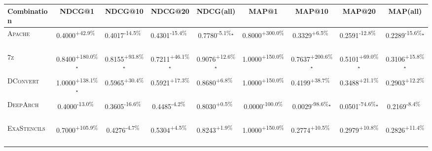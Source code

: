 \begin{table}[htbp]
\centering
\renewcommand{\arraystretch}{1.2}
\begin{tabular}{l|cccc|cccc}
\hline
Combination & NDCG@1 & NDCG@10 & NDCG@20 & NDCG(all) & MAP@1 & MAP@10 & MAP@20 & MAP(all) \\ \hline
\textsc{Apache} & \cellcolor{green!30}0.4000\textsuperscript{+42.9\%}$^{\,\,\,}$ & \cellcolor{red!30}0.4017\textsuperscript{-14.5\%}$^{\,\,\,}$ & \cellcolor{red!30}0.4301\textsuperscript{-15.4\%}$^{\,\,\,}$ & \cellcolor{red!30}0.7780\textsuperscript{-5.1\%}$^\star$ & \cellcolor{green!30}0.8000\textsuperscript{+300.0\%}$^{\,\,\,}$ & \cellcolor{green!30}0.3329\textsuperscript{+6.5\%}$^{\,\,\,}$ & \cellcolor{red!30}0.2591\textsuperscript{-12.8\%}$^{\,\,\,}$ & \cellcolor{red!30}0.2289\textsuperscript{-15.6\%}$^\star$ \\
\textsc{7z} & \cellcolor{green!30}0.8400\textsuperscript{+180.0\%}$^\star$ & \cellcolor{green!30}0.8155\textsuperscript{+93.8\%}$^\star$ & \cellcolor{green!30}0.7211\textsuperscript{+46.1\%}$^\star$ & \cellcolor{green!30}0.9076\textsuperscript{+12.6\%}$^\star$ & \cellcolor{green!30}1.0000\textsuperscript{+150.0\%}$^{\,\,\,}$ & \cellcolor{green!30}0.7637\textsuperscript{+200.6\%}$^\star$ & \cellcolor{green!30}0.5101\textsuperscript{+69.0\%}$^\star$ & \cellcolor{green!30}0.3106\textsuperscript{+15.8\%}$^\star$ \\
\textsc{DConvert} & \cellcolor{green!30}1.0000\textsuperscript{+138.1\%}$^\star$ & \cellcolor{green!30}0.5965\textsuperscript{+30.4\%}$^{\,\,\,}$ & \cellcolor{green!30}0.5921\textsuperscript{+17.3\%}$^{\,\,\,}$ & \cellcolor{green!30}0.8680\textsuperscript{+6.8\%}$^{\,\,\,}$ & \cellcolor{green!30}1.0000\textsuperscript{+150.0\%}$^{\,\,\,}$ & \cellcolor{green!30}0.4199\textsuperscript{+38.7\%}$^{\,\,\,}$ & \cellcolor{green!30}0.3488\textsuperscript{+21.1\%}$^{\,\,\,}$ & \cellcolor{green!30}0.2903\textsuperscript{+12.2\%}$^{\,\,\,}$ \\
\textsc{DeepArch} & \cellcolor{red!30}0.4000\textsuperscript{-13.0\%}$^{\,\,\,}$ & \cellcolor{red!30}0.3605\textsuperscript{-16.6\%}$^{\,\,\,}$ & \cellcolor{red!30}0.4485\textsuperscript{-4.2\%}$^{\,\,\,}$ & \cellcolor{green!30}0.8030\textsuperscript{+0.5\%}$^{\,\,\,}$ & \cellcolor{red!30}0.0000\textsuperscript{-100.0\%}$^{\,\,\,}$ & \cellcolor{red!30}0.0029\textsuperscript{-98.6\%}$^\star$ & \cellcolor{red!30}0.0501\textsuperscript{-74.6\%}$^\star$ & \cellcolor{red!30}0.2169\textsuperscript{-8.4\%}$^{\,\,\,}$ \\
\textsc{ExaStencils} & \cellcolor{green!30}0.7000\textsuperscript{+105.9\%}$^{\,\,\,}$ & \cellcolor{red!30}0.4276\textsuperscript{-4.7\%}$^{\,\,\,}$ & \cellcolor{green!30}0.5304\textsuperscript{+4.5\%}$^{\,\,\,}$ & \cellcolor{green!30}0.8243\textsuperscript{+1.9\%}$^{\,\,\,}$ & \cellcolor{green!30}1.0000\textsuperscript{+150.0\%}$^{\,\,\,}$ & \cellcolor{green!30}0.2774\textsuperscript{+10.5\%}$^{\,\,\,}$ & \cellcolor{green!30}0.2979\textsuperscript{+10.8\%}$^{\,\,\,}$ & \cellcolor{green!30}0.2826\textsuperscript{+11.4\%}$^{\,\,\,}$ \\

\end{tabular}
\end{table}
